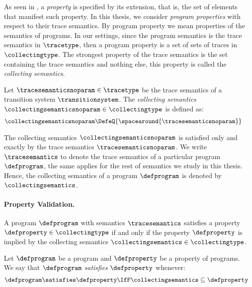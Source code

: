 As seen in , a \emph{property} is specified by its extension, that is, the set of elements that manifest such property.
In this thesis, we consider \emph{program properties} with respect to their trace semantics.
By program property we mean properties of the semantics of programs.
In our settings, since the program semantics is the trace semantics in $\tracetype$, then a program property is a set of sets of traces in $\collectingtype$.
The strongest property of the trace semantics is the set containing the trace semantics and nothing else, this property is called the \emph{collecting semantics}.

\begin{definition}
  Let $\tracesemanticsnoparam\in\tracetype$ be the trace semantics of a transition system $\transitionsystem$. The \emph{collecting semantics} $\collectingsemanticsnoparam\in\collectingtype$ is defined as:
  \begin{align*}
    \collectingsemanticsnoparam &\DefeQ \{\spacearound{\tracesemanticsnoparam}\}
  \end{align*}
\end{definition}

The collecting semantics $\collectingsemanticsnoparam$ is satisfied only and exactly by the trace semantics $\tracesemanticsnoparam$.
We write $\tracesemantics$ to denote the trace semantics of a particular program $\defprogram$, the same applies for the rest of semantics we study in this thesis. Hence, the collecting semantics of a program $\defprogram$ is denoted by $\collectingsemantics$.

\paragraph{Property Validation.}

A program $\defprogram$ with semantics $\tracesemantics$ satisfies a property $\defproperty \in \collectingtype$ if and only if the property $\defproperty$ is implied by the collecting semantics $\collectingsemantics\in\collectingtype$.


\begin{definition}
  Let $\defprogram$ be a program and $\defproperty$ be a property of programs. We say that $\defprogram$ \emph{satisfies} $\defproperty$ whenever:
  \begin{align*}
    \defprogram \satisfies \defproperty \IfF \collectingsemantics \subseteq \defproperty
  \end{align*}
\end{definition}

